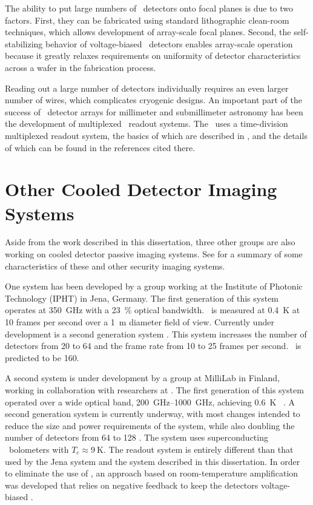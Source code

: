 The ability to put large numbers of \TES\ detectors onto focal planes is due to two factors.
First, they can be fabricated using standard lithographic clean-room techniques, which allows development of array-scale focal planes.
Second, the self-stabilizing behavior of voltage-biased \TES\ detectors enables array-scale operation because it greatly relaxes requirements on uniformity of detector characteristics across a wafer in the fabrication process.

Reading out a large number of detectors individually requires an even larger number of wires, which complicates cryogenic designs.
An important part of the success of \TES\ detector arrays for millimeter and submillimeter astronomy has been the development of multiplexed \SQUID\ readout systems.
The \Imager\ uses a time-division multiplexed readout system, the basics of which are described in , and the details of which can be found in the references cited there.
 

\section{Other Cooled Detector Imaging Systems}

Aside from the work described in this dissertation, three other groups are also working on cooled detector passive imaging systems.
See  for a summary of some characteristics of these and other security imaging systems.

One system has been developed by a group working at the Institute of Photonic Technology (IPHT) in Jena, Germany.
The first generation of this system \cite{heinz_toward_2011} operates at \SI{350}{\GHz} with a \SI{23}{\percent} optical bandwidth.
\NETD\ is measured at \SI{0.4}{\K} at 10 frames per second over a \SI{1}{\m} diameter field of view.
Currently under development is a second generation system \cite{heinz_development_2013,may_next_2013}.
This system increases the number of detectors from 20 to 64 and the frame rate from 10 to 25 frames per second.
\NETD\ is predicted to be \SI{160}{\mK}.

A second system is under development by a group at MilliLab in Finland, working in collaboration with researchers at \NIST.
The first generation of this system operated over a wide optical band, \SIrange{200}{1000}{\GHz}, achieving \SI{0.6}{\K} \NETD\ \cite{grossman_passive_2010}.
A second generation system is currently underway, with most changes intended to reduce the size and power requirements of the system, while also doubling the number of detectors from 64 to 128 \cite{luukanen_applications_2012}.
The system uses superconducting \TES\ bolometers with $T_c \approx \SI{9}{\K}$.
The readout system is entirely different than that used by the Jena system and the system described in this dissertation.
In order to eliminate the use of \SQUIDs, an approach based on room-temperature amplification was developed that relies on negative feedback to keep the detectors voltage-biased \cite{penttila_low-noise_2006}.

